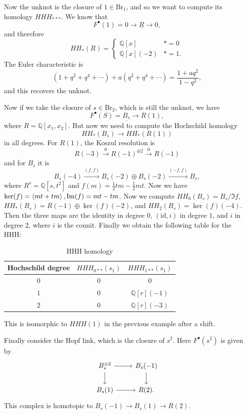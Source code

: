 \documentclass[leqno, openany]{memoir}
\theoremstyle{definition}
\theoremstyle{remark}
\theoremstyle{plain}
\theoremstyle{definition}
\theoremstyle{remark}
\newcommand{\Q}{\mathbb{Q}}
\newcommand{\mr}[1]{\mathrm{#1}}
\newcommand{\ul}[1]{\underline{#1}}
\newcommand{\1}{\mathbf{1}}
\newcommand{\2}{\mathbf{2}}
\newcommand{\3}{\mathbf{3}}
\begin{document}
Now the unknot is the closure of $1 \in \mr{Br}_1$, and so we want to compute its homology $HHH_{***}$. We know that
\[ F^{\bullet}(1) = 0 \to \ul{R} \to 0, \]
and therefore
\[ HH_*(R) = \begin{cases}
    \Q[x] & * = 0 \\ 
    \Q[x](-2) & * = 1.
\end{cases}
\]
The Euler characteristic is
\[ (1 + q^2 + q^4 + \cdots) + a (q^2 + q^4 + \cdots) = \frac{1+aq^2}{1-q^2}, \]
and this recovers the unknot.

Now if we take the closure of $s \in \mr{Br}_2$, which is still the unknot, we have
\[ F^{\bullet}(S) = \ul{B_s} \to R(1) ,\]
where $R = \Q[x_1, x_2]$. But now we need to compute the Hochschild homology
\[ HH_*(B_s) \to HH_*(R(1)) \]
in all degrees. For $R(1)$, the Koszul resolution is
\[ R(-3) \xrightarrow{0} { R(-1) }^{\oplus 2} \xrightarrow{0} R(-1) \]
and for $B_s$ it is
\[ B_s(-4) \xrightarrow{(f,f)} B_s(-2) \oplus B_s(-2) \xrightarrow{(-f,f)} B_s, \]
where $R^s = \Q[s,t^2]$ and $f(m) = \frac{1}{2} tm - \frac{1}{2} mt$. Now we have $\ker(f) = \ev{mt+tm}, \Im(f) = mt-tm$. Now we compute $HH_0(B_s) = B_s/\Im f$, $HH_*(B_s) = R(-1) \oplus \ker(f)(-2)$, and $HH_2(B_s) = \ker(f)(-4)$. Then the three maps are the identity in degree $0$, $(\mr{id}, i)$ in degree $1$, and $i$ in degree $2$, where $i$ is the counit. Finally we obtain the following table for the HHH:
\begin{table}[H]
    \centering
    \caption{HHH homology}
    \label{tab:label}
    \begin{tabular}{ccc}
    \toprule
    Hochschild degree & $HHH_{0**}(s_1)$ & $HHH_{1**}(s_1)$ \\
    \midrule
        $0$ & $0$ & $0$ \\
        $1$ & $0$ & $\Q[r](-1)$ \\
        $2$ & $0$ & $\Q[r](-3)$
    \end{tabular}
\end{table}

This is isomorphic to $HHH(1)$ in the previous example after a shift.

Finally consider the Hopf link, which is the closure of $s^2$. Here $F^{\bullet}(s^2)$ is given by
\begin{equation*}
\begin{tikzcd}
    B_s^{\otimes 2} \ar{r} \ar{d} & B_s(-1) \ar{d} \\
    B_s(1) \ar{r} & R(2).
\end{tikzcd}
\end{equation*}
This complex is homotopic to $B_s(-1) \to B_s(1) \to R(2)$.
\end{document}
